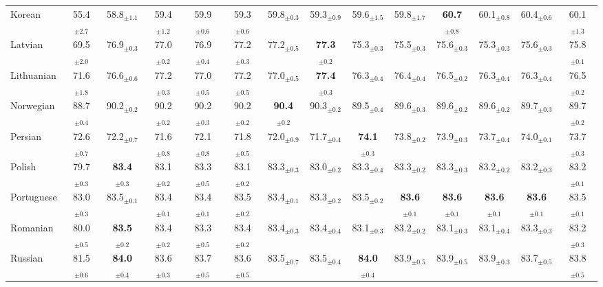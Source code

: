 \begin{table*}[ht]
{\begin{tabular}{lccccccccccccc}
Korean & 55.4$_{\pm 2.7}$ & 58.8$_{\pm 1.1}$ & 59.4$_{\pm 1.2}$ & 59.9$_{\pm 0.6}$ & 59.3$_{\pm 0.6}$ & 59.8$_{\pm 0.3}$ & 59.3$_{\pm 0.9}$ & 59.6$_{\pm 1.5}$ & 59.8$_{\pm 1.7}$ & \textbf{60.7}$_{\pm 0.8}$ & 60.1$_{\pm 0.8}$ & 60.4$_{\pm 0.6}$ & 60.1$_{\pm 1.3}$ \\
Latvian & 69.5$_{\pm 2.0}$ & 76.9$_{\pm 0.3}$ & 77.0$_{\pm 0.2}$ & 76.9$_{\pm 0.4}$ & 77.2$_{\pm 0.3}$ & 77.2$_{\pm 0.5}$ & \textbf{77.3}$_{\pm 0.2}$ & 75.3$_{\pm 0.3}$ & 75.5$_{\pm 0.3}$ & 75.6$_{\pm 0.3}$ & 75.3$_{\pm 0.3}$ & 75.6$_{\pm 0.3}$ & 75.8$_{\pm 0.1}$ \\
Lithuanian & 71.6$_{\pm 1.8}$ & 76.6$_{\pm 0.6}$ & 77.2$_{\pm 0.3}$ & 77.0$_{\pm 0.5}$ & 77.2$_{\pm 0.5}$ & 77.0$_{\pm 0.5}$ & \textbf{77.4}$_{\pm 0.3}$ & 76.3$_{\pm 0.4}$ & 76.4$_{\pm 0.4}$ & 76.5$_{\pm 0.2}$ & 76.3$_{\pm 0.4}$ & 76.3$_{\pm 0.4}$ & 76.5$_{\pm 0.2}$ \\
Norwegian & 88.7$_{\pm 0.4}$ & 90.2$_{\pm 0.2}$ & 90.2$_{\pm 0.2}$ & 90.2$_{\pm 0.3}$ & 90.2$_{\pm 0.2}$ & \textbf{90.4}$_{\pm 0.2}$ & 90.3$_{\pm 0.2}$ & 89.5$_{\pm 0.4}$ & 89.6$_{\pm 0.3}$ & 89.6$_{\pm 0.2}$ & 89.6$_{\pm 0.2}$ & 89.7$_{\pm 0.3}$ & 89.7$_{\pm 0.2}$ \\
Persian & 72.6$_{\pm 0.7}$ & 72.2$_{\pm 0.7}$ & 71.6$_{\pm 0.8}$ & 72.1$_{\pm 0.8}$ & 71.8$_{\pm 0.5}$ & 72.0$_{\pm 0.9}$ & 71.7$_{\pm 0.4}$ & \textbf{74.1}$_{\pm 0.3}$ & 73.8$_{\pm 0.2}$ & 73.9$_{\pm 0.3}$ & 73.7$_{\pm 0.4}$ & 74.0$_{\pm 0.1}$ & 73.7$_{\pm 0.3}$ \\
Polish & 79.7$_{\pm 0.3}$ & \textbf{83.4}$_{\pm 0.3}$ & 83.1$_{\pm 0.2}$ & 83.3$_{\pm 0.5}$ & 83.1$_{\pm 0.2}$ & 83.3$_{\pm 0.3}$ & 83.0$_{\pm 0.2}$ & 83.3$_{\pm 0.4}$ & 83.3$_{\pm 0.2}$ & 83.3$_{\pm 0.3}$ & 83.2$_{\pm 0.2}$ & 83.2$_{\pm 0.3}$ & 83.2$_{\pm 0.1}$ \\
Portuguese & 83.0$_{\pm 0.3}$ & 83.5$_{\pm 0.1}$ & 83.4$_{\pm 0.1}$ & 83.4$_{\pm 0.1}$ & 83.5$_{\pm 0.2}$ & 83.4$_{\pm 0.1}$ & 83.3$_{\pm 0.2}$ & 83.5$_{\pm 0.2}$ & \textbf{83.6}$_{\pm 0.1}$ & \textbf{83.6}$_{\pm 0.1}$ & \textbf{83.6}$_{\pm 0.1}$ & \textbf{83.6}$_{\pm 0.1}$ & 83.5$_{\pm 0.1}$ \\
Romanian & 80.0$_{\pm 0.5}$ & \textbf{83.5}$_{\pm 0.2}$ & 83.4$_{\pm 0.2}$ & 83.3$_{\pm 0.5}$ & 83.4$_{\pm 0.2}$ & 83.4$_{\pm 0.3}$ & 83.4$_{\pm 0.4}$ & 83.1$_{\pm 0.3}$ & 83.2$_{\pm 0.2}$ & 83.1$_{\pm 0.3}$ & 83.1$_{\pm 0.4}$ & 83.3$_{\pm 0.3}$ & 83.2$_{\pm 0.3}$ \\
Russian & 81.5$_{\pm 0.6}$ & \textbf{84.0}$_{\pm 0.4}$ & 83.6$_{\pm 0.3}$ & 83.7$_{\pm 0.5}$ & 83.6$_{\pm 0.5}$ & 83.5$_{\pm 0.7}$ & 83.5$_{\pm 0.4}$ & \textbf{84.0}$_{\pm 0.4}$ & 83.9$_{\pm 0.5}$ & 83.9$_{\pm 0.5}$ & 83.9$_{\pm 0.3}$ & 83.7$_{\pm 0.5}$ & 83.8$_{\pm 0.5}$ \\

\end{tabular}}
\end{table*}
